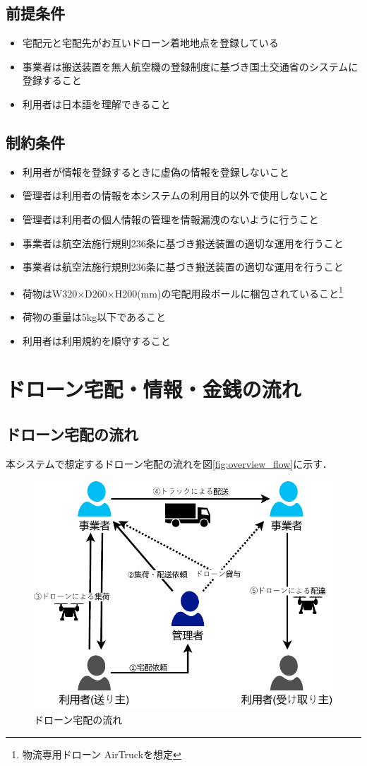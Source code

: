 \documentclass[a4paper, titlepage]{jsarticle}
\begin{document}
\subsection{前提条件}
\begin{itemize}
\item 宅配元と宅配先がお互いドローン着地地点を登録している
\item 事業者は搬送装置を無人航空機の登録制度に基づき国土交通省のシステムに登録すること
\item 利用者は日本語を理解できること
\end{itemize}
\subsection{制約条件}
\begin{itemize}
\item 利用者が情報を登録するときに虚偽の情報を登録しないこと
\item 管理者は利用者の情報を本システムの利用目的以外で使用しないこと
\item 管理者は利用者の個人情報の管理を情報漏洩のないように行うこと
\item 事業者は航空法施行規則236条に基づき搬送装置の適切な運用を行うこと
\item 事業者は航空法施行規則236条に基づき搬送装置の適切な運用を行うこと
\item 荷物はW320×D260×H200(mm)の宅配用段ボールに梱包されていること\footnote{\label{fot:airtruck}物流専用ドローン AirTruckを想定}
\item 荷物の重量は5kg以下であること
\item 利用者は利用規約を順守すること
\end{itemize}
\section{ドローン宅配・情報・金銭の流れ}

\subsection{ドローン宅配の流れ}
本システムで想定するドローン宅配の流れを図\ref{fig:overview_flow}に示す．

\begin{figure}[H]
  \centering
  \includegraphics[width=0.6\linewidth]{./overview_flow.pdf}
  \caption{ドローン宅配の流れ}
  \label{fig:overview_flow_1}
\end{figure}
\end{document}
